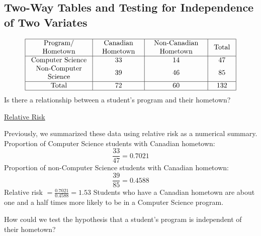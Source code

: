 \subsection{Two-Way Tables and Testing for Independence of Two Variates}

\[ \begin{array}{|c|c|c|c|}
        \hline \begin{array}{c}
            \text { Program/ } \\
            \text { Hometown }
        \end{array} & \begin{array}{c}
            \text { Canadian } \\
            \text { Hometown }
        \end{array} & \begin{array}{c}
            \text { Non-Canadian } \\
            \text { Hometown }
        \end{array} & \text { Total } \\
        \hline \text { Computer Science } & 33                         & 14                         & 47              \\
        \begin{array}{c}
            \text { Non-Computer } \\
            \text { Science }
        \end{array}        & 39                         & 46                         & 85              \\
        \hline \text { Total }            & 72                         & 60                         & 132             \\
        \hline
    \end{array} \]
Is there a relationship between a student's program and their hometown?

\underline{Relative Risk}

Previously, we summarized these data using relative risk as a numerical summary.
Proportion of Computer Science students with Canadian hometown:
\[
    \frac{33}{47}=0.7021
\]
Proportion of non-Computer Science students with Canadian hometown:
\[
    \frac{39}{85}=0.4588
\]
Relative risk $=\frac{0.7021}{0.4588}=1.53$
Students who have a Canadian hometown are about one and a half times more likely to be in a Computer Science program.

How could we test the hypothesis that a student's program is independent of their hometown?


